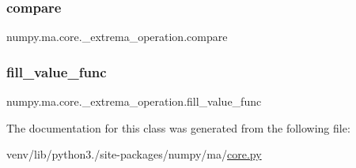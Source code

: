 \subsubsection{\texorpdfstring{compare}{compare}}
{\footnotesize\ttfamily numpy.\+ma.\+core.\+\_\+extrema\+\_\+operation.\+compare}

\mbox{\label{classnumpy_1_1ma_1_1core_1_1__extrema__operation_a76a3dac7bc2d654bbfac87fcb9ea30df}} 
\subsubsection{\texorpdfstring{fill\+\_\+value\+\_\+func}{fill\_value\_func}}
{\footnotesize\ttfamily numpy.\+ma.\+core.\+\_\+extrema\+\_\+operation.\+fill\+\_\+value\+\_\+func}



The documentation for this class was generated from the following file\+:\begin{DoxyCompactItemize}
\item 
venv/lib/python3./site-\/packages/numpy/ma/\hyperlink{numpy_2ma_2core_8py}{core.\+py}\end{DoxyCompactItemize}
